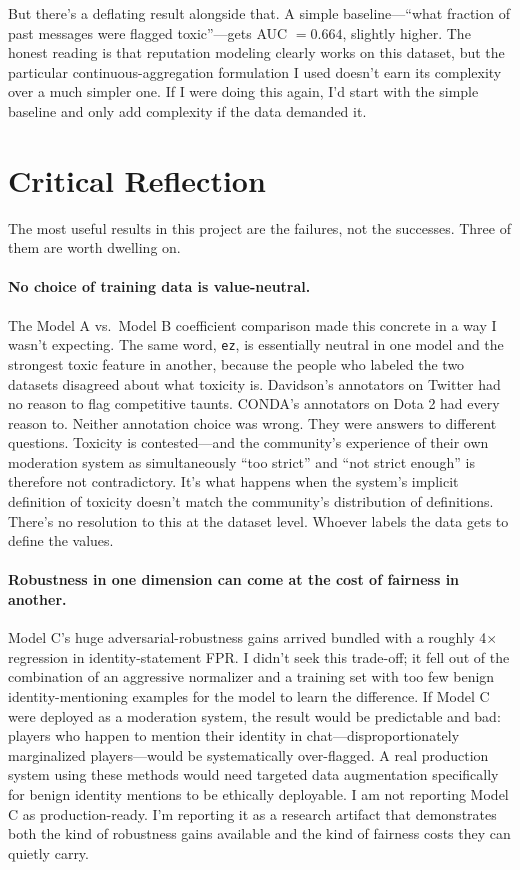 \documentclass[11pt,twocolumn,letterpaper]{article}
\begin{document}
But there's a deflating result alongside that. A simple baseline---``what fraction of past messages were flagged toxic''---gets AUC $= 0.664$, slightly higher. The honest reading is that reputation modeling clearly works on this dataset, but the particular continuous-aggregation formulation I used doesn't earn its complexity over a much simpler one. If I were doing this again, I'd start with the simple baseline and only add complexity if the data demanded it.

\FloatBarrier

\section{Critical Reflection}

The most useful results in this project are the failures, not the successes. Three of them are worth dwelling on.

\paragraph{No choice of training data is value-neutral.}
The Model A vs.\ Model B coefficient comparison made this concrete in a way I wasn't expecting. The same word, \texttt{ez}, is essentially neutral in one model and the strongest toxic feature in another, because the people who labeled the two datasets disagreed about what toxicity is. Davidson's annotators on Twitter had no reason to flag competitive taunts. CONDA's annotators on Dota 2 had every reason to. Neither annotation choice was wrong. They were answers to different questions. Toxicity is contested---and the community's experience of their own moderation system as simultaneously ``too strict'' and ``not strict enough'' is therefore not contradictory. It's what happens when the system's implicit definition of toxicity doesn't match the community's distribution of definitions. There's no resolution to this at the dataset level. Whoever labels the data gets to define the values.

\paragraph{Robustness in one dimension can come at the cost of fairness in another.}
Model C's huge adversarial-robustness gains arrived bundled with a roughly 4$\times$ regression in identity-statement FPR. I didn't seek this trade-off; it fell out of the combination of an aggressive normalizer and a training set with too few benign identity-mentioning examples for the model to learn the difference. If Model C were deployed as a moderation system, the result would be predictable and bad: players who happen to mention their identity in chat---disproportionately marginalized players---would be systematically over-flagged. A real production system using these methods would need targeted data augmentation specifically for benign identity mentions to be ethically deployable. I am not reporting Model C as production-ready. I'm reporting it as a research artifact that demonstrates both the kind of robustness gains available and the kind of fairness costs they can quietly carry.
\end{document}
